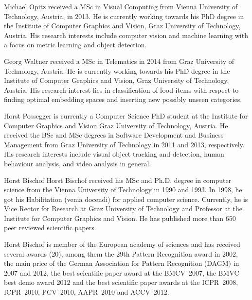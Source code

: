 \documentclass[10pt,journal,compsoc]{IEEEtran}
\begin{document}
\ifCLASSOPTIONcaptionsoff\newpage\fi\vspace{-1.0cm}\begin{IEEEbiography}{Michael Opitz}
received a MSc in Visual Computing from Vienna University of Technology, Austria, in 2013. He is currently working towards his PhD degree in the Institute of Computer Graphics and Vision, Graz University of Technology, Austria. His research interests include computer vision and machine learning with a focus on metric learning and object detection.
\end{IEEEbiography}\vspace{-1.0cm}\begin{IEEEbiography}{Georg Waltner}
received a MSc in Telematics in 2014 from Graz University of Technology, Austria. He is currently working towards his PhD degree in the Institute of Computer Graphics and Vision, Graz University of Technology, Austria. His research interest lies in classification of food items with respect to finding optimal embedding spaces and inserting new possibly unseen categories. 
\end{IEEEbiography}\vspace{-1.0cm}\begin{IEEEbiography}{Horst Possegger}
    is currently a Computer Science PhD student at the Institute for Computer Graphics and Vision Graz University of Technology, Austria. He received the BSc and MSc degrees in Software Development and Business Management from Graz University of Technology in 2011 and 2013, respectively. His research interests include visual object tracking and detection, human behaviour analysis, and video analysis in general.
\end{IEEEbiography}\vspace{-1.0cm}\begin{IEEEbiography}{Horst Bischof}
Horst Bischof received his MSc and Ph.D. degree in computer science from the Vienna University of Technology in 1990 and 1993. In 1998, he got his Habilitation (venia docendi) for applied computer science. Currently, he is Vice Rector for Research at Graz University of Technology and Professor at the Institute for Computer Graphics and Vision. 
He has published more than 650 peer reviewed scientific papers.


Horst Bischof is member of the European academy of sciences and has received several awards (20), among them the 29th Pattern Recognition award in 2002, the main price of the German Association for Pattern Recognition (DAGM) in 2007 and 2012, the best scientific paper award at the BMCV~2007, the BMVC best demo award 2012 and the best scientific paper awards at the ICPR~2008, ICPR~2010, PCV~2010, AAPR~2010 and ACCV~2012.
\end{IEEEbiography}
\end{document}
